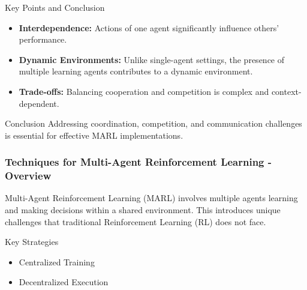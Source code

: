 \documentclass[aspectratio=169]{beamer}
\begin{document}
\begin{frame}[fragile]{Key Points and Conclusion}
    \begin{itemize}
        \item \textbf{Interdependence:} Actions of one agent significantly influence others' performance.
        \item \textbf{Dynamic Environments:} Unlike single-agent settings, the presence of multiple learning agents contributes to a dynamic environment.
        \item \textbf{Trade-offs:} Balancing cooperation and competition is complex and context-dependent.
    \end{itemize}
    \begin{block}{Conclusion}
        Addressing coordination, competition, and communication challenges is essential for effective MARL implementations.
    \end{block}
\end{frame}

\begin{frame}[fragile]
    \frametitle{Techniques for Multi-Agent Reinforcement Learning - Overview}
    Multi-Agent Reinforcement Learning (MARL) involves multiple agents learning and making decisions within a shared environment. This introduces unique challenges that traditional Reinforcement Learning (RL) does not face. 
    \begin{block}{Key Strategies}
        \begin{itemize}
            \item Centralized Training
            \item Decentralized Execution
        \end{itemize}
    \end{block}
\end{frame}
\end{document}
